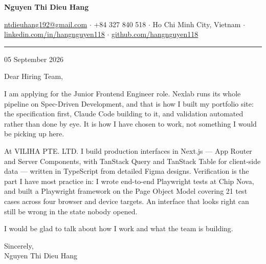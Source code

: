 \documentclass[11pt,a4paper]{article}
\newcommand{\clname}[1]{{\fontsize{17}{19}\selectfont\bfseries #1}\par\vspace{0.2em}}
\newcommand{\clcontact}[1]{{\small\color{muted}#1}\par\vspace{0.3em}%
  {\color{rulegray}\rule{\linewidth}{0.5pt}}\par}
\newcommand{\cldate}[1]{{\small\color{muted}#1}\par}
\begin{document}
\clname{Nguyen Thi Dieu Hang}
\clcontact{\href{mailto:ntdieuhang192@gmail.com}{ntdieuhang192@gmail.com} $\cdot$ +84 327 840 518 $\cdot$ Ho Chi Minh City, Vietnam $\cdot$ \href{https://www.linkedin.com/in/hangnguyen118}{linkedin.com/in/hangnguyen118} $\cdot$ \href{https://github.com/hangnguyen118}{github.com/hangnguyen118}}
\cldate{05 September 2026}

Dear Hiring Team,

I am applying for the Junior Frontend Engineer role. Nexlab runs its whole pipeline on Spec-Driven Development, and that is how I built my portfolio site: the specification first, Claude Code building to it, and validation automated rather than done by eye. It is how I have chosen to work, not something I would be picking up here.

At VILIHA PTE. LTD. I build production interfaces in Next.js — App Router and Server Components, with TanStack Query and TanStack Table for client-side data — written in TypeScript from detailed Figma designs. Verification is the part I have most practice in: I wrote end-to-end Playwright tests at Chip Nova, and built a Playwright framework on the Page Object Model covering 21 test cases across four browser and device targets. An interface that looks right can still be wrong in the state nobody opened.

I would be glad to talk about how I work and what the team is building.

Sincerely, \\
Nguyen Thi Dieu Hang
\end{document}
